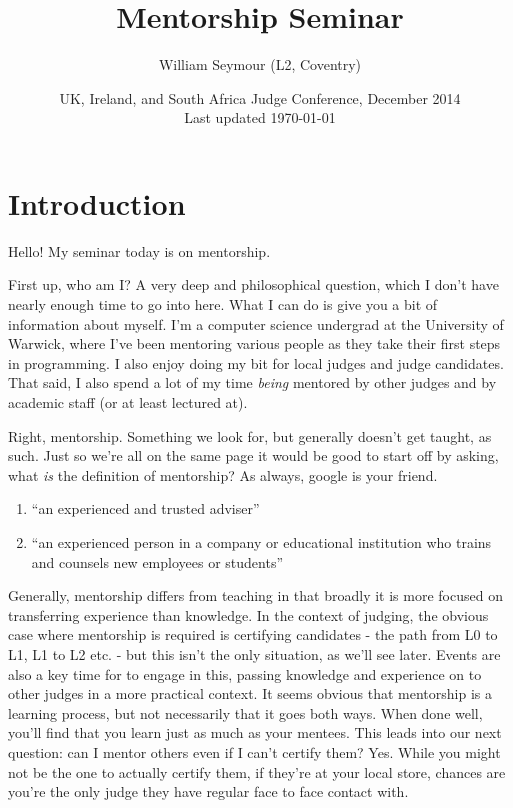 \documentclass[10pt,a4paper]{article}
\author{William Seymour (L2, Coventry)}
\date{UK, Ireland, and South Africa Judge Conference, December 2014 \\ Last updated \today}
\title{Mentorship Seminar}
\begin{document}
\maketitle
\clearpage
\tableofcontents
\section{Introduction}
Hello! My seminar today is on mentorship. 

First up, who am I? A very deep and philosophical question, which I don't have nearly enough time to go into here. What I can do is give you a bit of information about myself. I'm a computer science undergrad at the University of Warwick, where I've been mentoring various people as they take their first steps in programming. I also enjoy doing my bit for local judges and judge candidates. That said, I also spend a lot of my time \textit{being} mentored by other judges and by academic staff (or at least lectured at).

Right, mentorship.  Something we look for, but generally doesn't get taught, as such. Just so we're all on the same page it would be good to start off by asking, what \textit{is} the definition of mentorship? As always, google is your friend.

\begin{enumerate}
	\item ``an experienced and trusted adviser''
	\item ``an experienced person in a company or educational institution who trains and counsels new employees or students''
\end{enumerate}

Generally, mentorship differs from teaching in that broadly it is more focused on transferring experience than knowledge. In the context of judging, the obvious case where mentorship is required is certifying candidates - the path from L0 to L1, L1 to L2 etc. - but this isn't the only situation, as we'll see later. Events are also a key time for to engage in this, passing knowledge and experience on to other judges in a more practical context. It seems obvious that mentorship is a learning process, but not necessarily that it goes both ways. When done well, you'll find that you learn just as much as your mentees. This leads into our next question: can I mentor others even if I can't certify them? Yes. While you might not be the one to actually certify them, if they're at your local store, chances are you're the only judge they have regular face to face contact with. 
\end{document}
